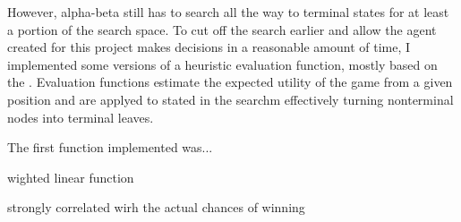\documentclass[a4paper]{article}
\begin{document}
However, alpha-beta still has to search all the way to terminal states for at least a portion of the search space. To cut off the search earlier and allow the agent created for this project makes decisions in a reasonable amount of time, I implemented some versions of a heuristic evaluation function, mostly based on the . Evaluation functions estimate the expected utility of the game from a given position and are applyed to stated in the searchm effectively turning nonterminal nodes into terminal leaves.


The first function implemented was...

wighted linear function

strongly correlated wirh the actual chances of winning






























\end{document}
